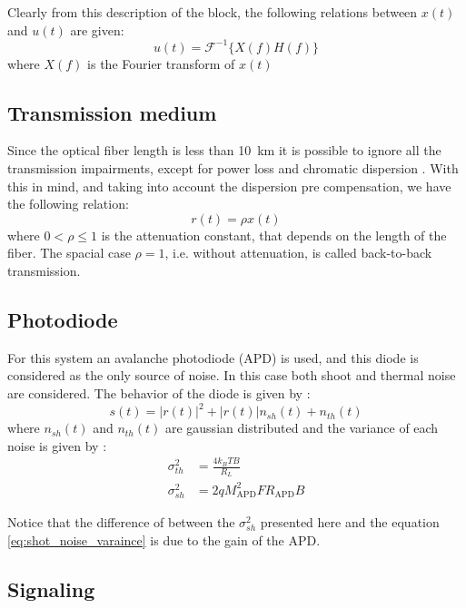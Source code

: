 Clearly from this description of the block, the following relations between $x(t)$ and $u(t)$ are given:
\begin{equation}
	u(t)=\mathcal{F}^{-1}\bigl\{X(f)H(f)\bigr\}
	\label{eq:Tuey_Disp_precomp}
\end{equation}
where $X(f)$ is the Fourier transform of $x(t)$


\subsection{Transmission medium}

Since the optical fiber length is less than \SI{10}{\km} it is possible to ignore all the transmission impairments, except for power loss and chromatic dispersion \cite{Tasbihi_Tukey}. With this in mind, and taking into account the dispersion pre compensation, we have the following relation:
\begin{equation}
r(t)=\rho x(t)
\label{eq:Tukey_fiber_out}
\end{equation}
 where $0<\rho\leq1$ is the attenuation constant, that depends on the length of the fiber. The spacial case $\rho=1$, i.e. without attenuation, is called back-to-back transmission.

\subsection{Photodiode}

For this system an avalanche photodiode (APD) is used, and this diode is considered as the only source of noise. In this case both shoot and thermal noise are considered. The behavior of  the diode is given by \cite{Tasbihi_Tukey}:
\begin{equation}
s(t)=\bigl|r(t)\bigr|^2+\bigl|r(t)\bigr|n_{sh}(t)+n_{th}(t)
\label{eq:Tukey_PD}
\end{equation}
where $n_{sh}(t)$ and $n_{th}(t)$ are gaussian distributed and the variance of each noise is given by \cite{Tasbihi_Tukey}:
\begin{align}
	\sigma^2_{th}&=\frac{4k_BTB}{R_L}\\
	\sigma^2_{sh}&=2qM^2_{\text{APD}}FR_\text{APD}B
\end{align}

Notice that the difference of between the $\sigma^2_{sh}$ presented here and the equation \ref{eq:shot_noise_varaince} is due to the gain of the APD.

\subsection{Signaling}

